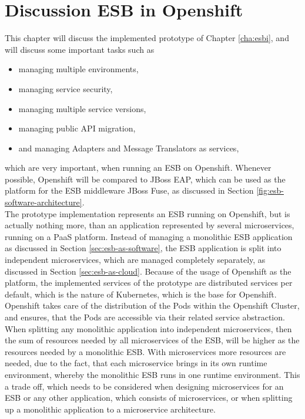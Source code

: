 \chapter{Discussion ESB in Openshift}
\label{cha:esbd}
This chapter will discuss the implemented prototype of Chapter \vref{cha:esbi}, and will discuss some important tasks such as 
\begin{itemize}
	\item managing multiple environments,
	\item managing service security,
	\item managing multiple service versions,
	\item managing public API migration,
	\item and managing Adapters and Message Translators as services,
\end{itemize}
which are very important, when running an ESB on Openshift. Whenever possible, Openshift will be compared to JBoss EAP, which can be used as the platform for the ESB middleware JBoss Fuse, as discussed in Section \vref{fig:esb-software-architecture}. \\

The prototype implementation represents an ESB running on Openshift, but is actually nothing more, than an application represented by several microservices, running on a PaaS platform. Instead of managing a monolithic ESB application as discussed in Section \vref{sec:esb-as-software}, the ESB application is split into independent microservices, which are managed completely separately, as discussed in Section \vref{sec:esb-as-cloud}. Because of the usage of Openshift as the platform, the implemented services of the prototype are distributed services per default, which is the nature of Kubernetes, which is the base for Openshift. Openshift takes care of the distribution of the Pods within the Openshift Cluster, and ensures, that the Pods are accessible via their related service abstraction. \\

When splitting any monolithic application into independent microservices, then the sum of resources needed by all microservices of the ESB, will be higher as the resources needed by a monolithic ESB. With microservices more resources are needed, due to the fact, that each microservice brings in its own runtime environment, whereby the monolithic ESB runs in one runtime environment. This a trade off, which needs to be considered when designing microservices for an ESB or any other application, which consists of microservices, or when splitting up a monolithic application to a microservice architecture. \\

